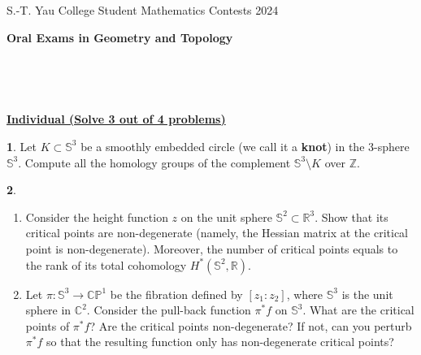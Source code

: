 \documentclass[12pt,a4paper]{amsart}
\theoremstyle{definition}
\newtheorem{problem}{}
\begin{document}
\begin{center}
S.-T. Yau College Student Mathematics Contests 2024\\

\vspace{0.1cm}

\Large {\bf Oral Exams in Geometry and Topology}




\end{center}

\

\

\begin{center}
\Large \underline{\bf Individual (Solve 3 out of 4 problems)}

\end{center}

\setcounter{problem}{0} \vspace{1cm}



\begin{problem}
Let $K \subset \mathbb{S}^3$ be a smoothly embedded circle (we call
it a \textbf{knot}) in the 3-sphere $\mathbb{S}^3$. Compute all the
homology groups of the complement $\mathbb{S}^3 \setminus K$ over
$\mathbb{Z}$.
\end{problem}


\begin{problem}
\begin{enumerate}
          \item Consider the height function $z$ on the unit sphere $\mathbb{S}^2 \subset \mathbb{R}^3$.  Show that its critical points are non-degenerate (namely, the Hessian matrix at the critical point is non-degenerate).  Moreover, the number of critical points equals to the rank of its total cohomology $H^*(\mathbb{S}^2,\mathbb{R})$.
          \item Let $\pi: \mathbb{S}^3 \to \mathbb{C}\mathbb{P}^1$ be the fibration defined by $[z_1:z_2]$, where $\mathbb{S}^3$ is the unit sphere in $\mathbb{C}^2$.  Consider the pull-back function $\pi^* f$ on $\mathbb{S}^3$.  What are the critical points of $\pi^* f$? Are the critical points non-degenerate? If not, can you perturb $\pi^* f$ so that the resulting function only has non-degenerate critical points?
        \end{enumerate}
\end{problem}
\end{document}
